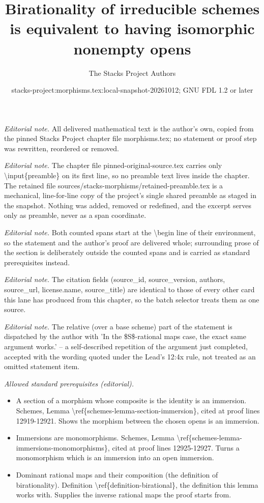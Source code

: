 \documentclass[10pt,a4paper]{amsart}
\title{Birationality of irreducible schemes is equivalent to having isomorphic nonempty opens}
\author{The Stacks Project Authors}
\date{stacks-project:morphisms.tex:local-snapshot-20261012; GNU FDL 1.2 or later}
\theoremstyle{plain}
\theoremstyle{definition}
\theoremstyle{remark}
\numberwithin{equation}{subsection}
\begin{document}
\maketitle
\setcounter{subsection}{1}
\noindent\textit{Editorial note.} All delivered mathematical text is the author's own, copied from the pinned Stacks Project chapter file morphisms.tex; no statement or proof step was rewritten, reordered or removed.\par\medskip
\noindent\textit{Editorial note.} The chapter file pinned-original-source.tex carries only \textbackslash{}input\{preamble\} on its first line, so no preamble text lives inside the chapter. The retained file sources/stacks-morphisms/retained-preamble.tex is a mechanical, line-for-line copy of the project's single shared preamble as staged in the snapshot. Nothing was added, removed or redefined, and the excerpt serves only as preamble, never as a span coordinate.\par\medskip
\noindent\textit{Editorial note.} Both counted spans start at the \textbackslash{}begin line of their environment, so the statement and the author's proof are delivered whole; surrounding prose of the section is deliberately outside the counted spans and is carried as standard prerequisites instead.\par\medskip
\noindent\textit{Editorial note.} The citation fields (source\_id, source\_version, authors, source\_url, license.name, source\_title) are identical to those of every other card this lane has produced from this chapter, so the batch selector treats them as one source.\par\medskip
\noindent\textit{Editorial note.} The relative (over a base scheme) part of the statement is dispatched by the author with 'In the \$S\$-rational maps case, the exact same argument works.' -- a self-described repetition of the argument just completed, accepted with the wording quoted under the Lead's 12:4x rule, not treated as an omitted statement item.\par\medskip
\noindent\textit{Allowed standard prerequisites (editorial).}\begin{itemize}
\item A section of a morphism whose composite is the identity is an immersion. Schemes, Lemma \textbackslash{}ref\{schemes-lemma-section-immersion\}, cited at proof lines 12919-12921. Shows the morphism between the chosen opens is an immersion.
\item Immersions are monomorphisms. Schemes, Lemma \textbackslash{}ref\{schemes-lemma-immersions-monomorphisms\}, cited at proof lines 12925-12927. Turns a monomorphism which is an immersion into an open immersion.
\item Dominant rational maps and their composition (the definition of birationality). Definition \textbackslash{}ref\{definition-birational\}, the definition this lemma works with. Supplies the inverse rational maps the proof starts from.
\end{itemize}\medskip
\end{document}
